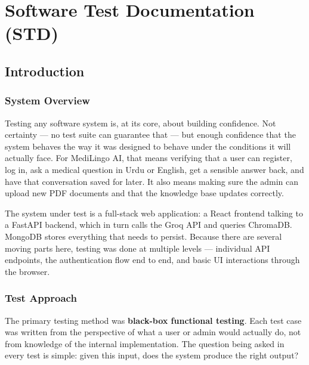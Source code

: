 
\chapter{Software Test Documentation (STD)}

\section{Introduction}

\subsection{System Overview}

Testing any software system is, at its core, about building confidence. Not certainty ---
no test suite can guarantee that --- but enough confidence that the system behaves the way
it was designed to behave under the conditions it will actually face. For MediLingo AI,
that means verifying that a user can register, log in, ask a medical question in Urdu or
English, get a sensible answer back, and have that conversation saved for later. It also
means making sure the admin can upload new PDF documents and that the knowledge base
updates correctly.

The system under test is a full-stack web application: a React frontend talking to a
FastAPI backend, which in turn calls the Groq API and queries ChromaDB. MongoDB stores
everything that needs to persist. Because there are several moving parts here, testing
was done at multiple levels --- individual API endpoints, the authentication flow end to
end, and basic UI interactions through the browser.

\subsection{Test Approach}

The primary testing method was \textbf{black-box functional testing}. Each test case
was written from the perspective of what a user or admin would actually do, not from
knowledge of the internal implementation. The question being asked in every test is
simple: given this input, does the system produce the right output?

